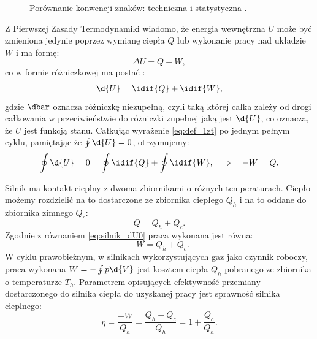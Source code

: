\begin{figure}
	\centering
	\begin{subfigure}{0.45\textwidth}
		\centering
		
		\caption{}
		\label{fig:konwencja_znakow_1}
	\end{subfigure}
	\begin{subfigure}{0.45\textwidth}
		\centering
		
		\caption{}
		\label{fig:konwencja_znakow_2}
	\end{subfigure}
	\captionsetup{subrefformat=parens}
	\caption{Porównanie konwencji znaków: techniczna  i statystyczna .}
\end{figure}

Z Pierwszej Zasady Termodynamiki wiadomo, że energia wewnętrzna \(U\) może być zmieniona jedynie poprzez wymianę ciepła \(Q\) lub wykonanie pracy nad układzie \(W\) i ma formę:
\begin{equation*}
	\Delta U = Q + W,
\end{equation*}
co w formie różniczkowej ma postać \cite{b:huang_mechanika_statystyczna}:
\begin{equation}\label{eq:def_1zt}
	\d{U} = \idif{Q} + \idif{W},
\end{equation}
gdzie \(\dbar\) oznacza różniczkę niezupełną, czyli taką której całka zależy od drogi całkowania w przeciwieństwie do różniczki zupełnej jaką jest \(\d{U}\), co oznacza, że \(U\) jest funkcją stanu. Całkując wyrażenie \eqref{eq:def_1zt} po jednym pełnym cyklu, pamiętając że \(\oint \d{U} = 0\), otrzymujemy:
\begin{equation}\label{eq:silnik_dU0}
	\oint \d{U} = 0 = \oint \idif{Q} + \oint \idif{W}, \quad\Rightarrow\quad
	-W = Q.
\end{equation}

Silnik ma kontakt cieplny z dwoma zbiornikami o różnych temperaturach. Ciepło możemy rozdzielić na to dostarczone ze zbiornika ciepłego \(Q_h\) i na to oddane do zbiornika zimnego \(Q_c\):
\begin{equation}\label{eq:ciepla_w_silniku}
	Q = Q_h + Q_c.
\end{equation}
Zgodnie z równaniem \eqref{eq:silnik_dU0} praca wykonana jest równa:
\begin{equation}\label{eq:praca_w_silniku}
	-W = Q_h + Q_c.
\end{equation}
W cyklu prawobieżnym, w silnikach wykorzystujących gaz jako czynnik roboczy, praca wykonana $W = - \oint p \d{V}$ jest kosztem ciepła $Q_h$ pobranego ze zbiornika o temperaturze $T_h$. Parametrem opisujących efektywność przemiany dostarczonego do silnika ciepła do uzyskanej pracy jest sprawność silnika cieplnego:
\begin{equation}\label{eq:def_sprawnosc_silnika}
\eta = \frac{-W}{Q_h} = \frac{Q_h + Q_c}{Q_h} = 1 + \frac{Q_c}{Q_h}.
\end{equation}

